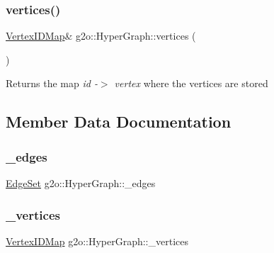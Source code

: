 \subsubsection{\texorpdfstring{vertices()}{vertices()}\hspace{0.1cm}{\footnotesize\ttfamily [2/2]}}
{\footnotesize\ttfamily \mbox{\hyperlink{classg2o_1_1_hyper_graph_a97307eac064ebf4b3e2cfbf0718035b5}{Vertex\+I\+D\+Map}}\& g2o\+::\+Hyper\+Graph\+::vertices (\begin{DoxyParamCaption}{ }\end{DoxyParamCaption})\hspace{0.3cm}{\ttfamily [inline]}}

\begin{DoxyReturn}{Returns}
the map {\itshape id -\/$>$ vertex} where the vertices are stored 
\end{DoxyReturn}


\subsection{Member Data Documentation}
\mbox{\label{classg2o_1_1_hyper_graph_afe4ae6e9ef05c8bded2b1b30e1886b36}} 
\subsubsection{\texorpdfstring{\+\_\+edges}{\_edges}}
{\footnotesize\ttfamily \mbox{\hyperlink{classg2o_1_1_hyper_graph_a5e2970e236c0dcb4eff7c205d7b6b4ae}{Edge\+Set}} g2o\+::\+Hyper\+Graph\+::\+\_\+edges\hspace{0.3cm}{\ttfamily [protected]}}

\mbox{\label{classg2o_1_1_hyper_graph_a83132c77c8d0896581d168cbc72f673a}} 
\subsubsection{\texorpdfstring{\+\_\+vertices}{\_vertices}}
{\footnotesize\ttfamily \mbox{\hyperlink{classg2o_1_1_hyper_graph_a97307eac064ebf4b3e2cfbf0718035b5}{Vertex\+I\+D\+Map}} g2o\+::\+Hyper\+Graph\+::\+\_\+vertices\hspace{0.3cm}{\ttfamily [protected]}}

